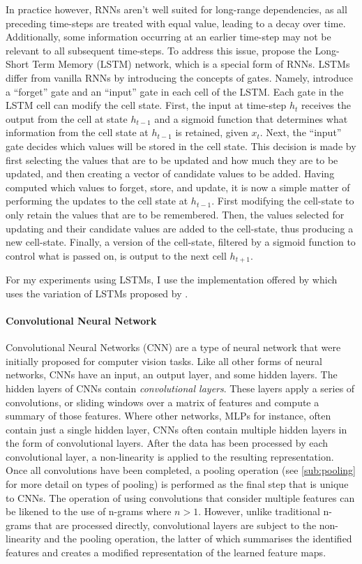In practice however, RNNs aren't well suited for long-range dependencies, as all preceding time-steps are treated with equal value, leading to a decay over time.
Additionally, some information occurring at an earlier time-step may not be relevant to all subsequent time-steps.
To address this issue, \citet{Schmidthuber:1997} propose the Long-Short Term Memory (LSTM) network, which is a special form of RNNs.
LSTMs differ from vanilla RNNs by introducing the concepts of gates. Namely, \citet{Schmidthuber:1997} introduce a ``forget'' gate and an ``input'' gate in each cell of the LSTM. Each gate in the LSTM cell can modify the cell state.
First, the input at time-step $h_t$ receives the output from the cell at state $h_{t-1}$ and a sigmoid function that determines what information from the cell state at $h_{t-1}$ is retained, given $x_t$.
Next, the ``input'' gate decides which values will be stored in the cell state. This decision is made by first selecting the values that are to be updated and how much they are to be updated, and then creating a vector of candidate values to be added.
Having computed which values to forget, store, and update, it is now a simple matter of performing the updates to the cell state at $h_{t-1}$. First modifying the cell-state to only retain the values that are to be remembered. Then, the values selected for updating and their candidate values are added to the cell-state, thus producing a new cell-state.
Finally, a version of the cell-state, filtered by a sigmoid function to control what is passed on, is output to the next cell $h_{t+1}$.

For my experiments using LSTMs, I use the implementation offered by \citet{Paszke:2019} which uses the variation of LSTMs proposed by \citet{Sak:2014}.

\paragraph{Convolutional Neural Network}
Convolutional Neural Networks (CNN) are a type of neural network that were initially proposed for computer vision tasks.
Like all other forms of neural networks, CNNs have an input, an output layer, and some hidden layers.
The hidden layers of CNNs contain \textit{convolutional layers}. These layers apply a series of convolutions, or sliding windows over a matrix of features and compute a summary of those features.
Where other networks, MLPs for instance, often contain just a single hidden layer, CNNs often contain multiple hidden layers in the form of convolutional layers.
After the data has been processed by each convolutional layer, a non-linearity is applied to the resulting representation.
Once all convolutions have been completed, a pooling operation (see \cref{sub:pooling} for more detail on types of pooling) is performed as the final step that is unique to CNNs.
The operation of using convolutions that consider multiple features can be likened to the use of n-grams where $n>1$. However, unlike traditional n-grams that are processed directly, convolutional layers are subject to the non-linearity and the pooling operation, the latter of which summarises the identified features and creates a modified representation of the learned feature maps.

